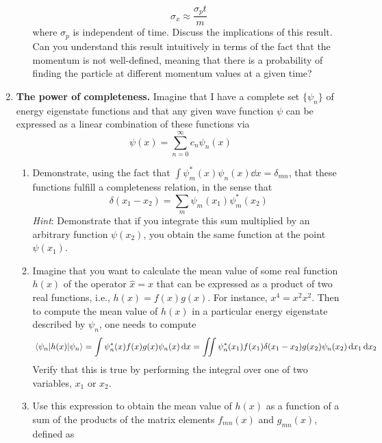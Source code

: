 \documentclass[../psets.tex]{subfiles}
\begin{document}
\begin{enumerate}
\begin{enumerate}
        \begin{equation}\label{eqn:4.6}
            \sigma_x \approx \frac{\sigma_pt}{m}
        \end{equation}
        where $\sigma_p$ is independent of time. Discuss the implications of this result. Can you understand this result intuitively in terms of the fact that the momentum is not well-defined, meaning that there is a probability of finding the particle at different momentum values at a given time?
    \end{enumerate}
    \item \textbf{The power of completeness.} Imagine that I have a complete set $\{\psi_n\}$ of energy eigenstate functions and that any given wave function $\psi$ can be expressed as a linear combination of these functions via
    \begin{equation}\label{eqn:4.7}
        \psi(x) = \sum_{n=0}^\infty c_n\psi_n(x)
    \end{equation}
    \begin{enumerate}
        \item Demonstrate, using the fact that $\int\psi_m^*(x)\psi_n(x)\dd{x}=\delta_{mn}$, that these functions fulfill a completeness relation, in the sense that
        \begin{equation}\label{eqn:4.8}
            \delta(x_1-x_2) = \sum_m\psi_m(x_1)\psi_m^*(x_2)
        \end{equation}
        \emph{Hint}: Demonstrate that if you integrate this sum multiplied by an arbitrary function $\psi(x_2)$, you obtain the same function at the point $\psi(x_1)$.
        \item Imagine that you want to calculate the mean value of some real function $h(x)$ of the operator $\hat{x}=x$ that can be expressed as a product of two real functions, i.e., $h(x)=f(x)g(x)$. For instance, $x^4=x^2x^2$. Then to compute the mean value of $h(x)$ in a particular energy eigenstate described by $\psi_n$, one needs to compute
        \begin{equation}\label{eqn:4.9}
            \ev{h(x)}{\psi_n} = \int\psi_n^*(x)f(x)g(x)\psi_n(x)\dd{x}
            = \iint\psi_n^*(x_1)f(x_1)\delta(x_1-x_2)g(x_2)\psi_n(x_2)\dd{x_1}\dd{x_2}
        \end{equation}
        Verify that this is true by performing the integral over one of two variables, $x_1$ or $x_2$.
        \item Use this expression to obtain the mean value of $h(x)$ as a function of a sum of the products of the matrix elements $f_{mn}(x)$ and $g_{mn}(x)$, defined as

\end{enumerate}
\end{enumerate}
\end{document}
